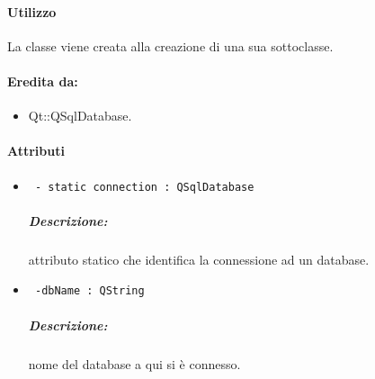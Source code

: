 \paragraph{Utilizzo\\}
La classe viene creata alla creazione di una sua sottoclasse.

\paragraph{Eredita da:}
	\begin{itemize}
		\item Qt::QSqlDatabase.
	\end{itemize}
	
\paragraph{\color{black}Attributi \\}
	\begin{itemize}
		\item \color{teal}\verb! - static connection : QSqlDatabase!\\
		\color{black}
		\subparagraph{Descrizione:} attributo statico che identifica la connessione ad un database.
		
		\item \color{teal}\verb! -dbName : QString!\\
		\color{black}
		\subparagraph{Descrizione:} nome del database a qui si è connesso.
		
	\end{itemize}

